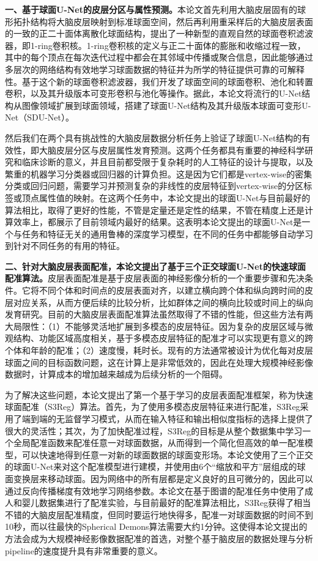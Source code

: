 \textbf{一、基于球面U-Net的皮层分区与属性预测。}本论文首先利用大脑皮层固有的球形拓扑结构将大脑皮层映射到标准球面空间，然后再利用重采样后的大脑皮层表面的一致的正二十面体离散化球面结构，提出了一种新型的直观自然的球面卷积滤波器，即1-ring卷积核。1-ring卷积核的定义与正二十面体的膨胀和收缩过程一致，其中的每个顶点在每次迭代过程中都会在其邻域中传播或聚合信息，因此能够通过多层次的网络结构有效地学习球面数据的特征并为所学的特征提供可靠的可解释性。基于这个新的球面卷积滤波器，我们开发了球面空间的球面卷积、池化和转置卷积，以及其升级版本可变形卷积与池化等操作。据此，本论文将流行的U-Net结构\cite{ronneberger2015u}从图像领域扩展到球面领域，搭建了球面U-Net结构及其升级版本球面可变形U-Net（SDU-Net）。

然后我们在两个具有挑战性的大脑皮层数据分析任务上验证了球面U-Net结构的有效性，即大脑皮层分区与皮层属性发育预测。这两个任务都具有重要的神经科学研究和临床诊断的意义，并且目前都受限于复杂耗时的人工特征的设计与提取，以及繁重的机器学习分类器或回归器的计算负担。这是因为它们都是vertex-wise的密集分类或回归问题，需要学习并预测复杂的非线性的皮层特征到vertex-wise的分区标签或顶点属性值的映射。在这两个任务中，本论文提出的球面U-Net与目前最好的算法相比，取得了更好的性能，不管是定量还是定性的结果，不管在精度上还是计算效率上，都展示了目前领域内最好的结果。这表明本论文提出的球面U-Net是一个与任务和特征无关的通用鲁棒的深度学习模型，在不同的任务中都能够自动学习到针对不同任务的有用的特征。

\textbf{二、针对大脑皮层表面配准，本论文提出了基于三个正交球面U-Net的快速球面配准算法。}皮层表面配准是基于皮层表面的神经影像分析的一个重要步骤和先决条件。它将不同个体和时间点的皮层表面对齐，以建立横向跨个体和纵向跨时间的皮层对应关系，从而方便后续的比较分析，比如群体之间的横向比较或时间上的纵向发育研究。目前的大脑皮层表面配准算法虽然取得了不错的性能，但这些方法有两大局限性：（1）不能够灵活地扩展到多模态的皮层特征。因为复杂的皮层区域与微观结构、功能区域高度相关，基于多模态皮层特征的配准才可以实现更有意义的跨个体和年龄的配准；（2）速度慢，耗时长。现有的方法通常被设计为优化每对皮层球面之间的目标函数问题，这在计算上是非常低效的，因此在处理大规模神经影像数据时，计算成本的增加越来越成为后续分析的一个阻碍。

为了解决这些问题，本论文提出了第一个基于学习的皮层表面配准框架，称为快速球面配准（S3Reg）算法。首先，为了使用多模态皮层特征来进行配准，S3Reg采用了端到端的无监督学习模式，从而在输入特征和输出相似度指标的选择上提供了很大的灵活性；其次，为了加快配准过程，S3Reg的目标是从整个数据集中学习一个全局配准函数来配准任意一对球面数据，从而得到一个简化但高效的单一配准模型，可以快速地得到任意一对新的球面数据的球面变形场。本论文使用了三个正交的球面U-Net来对这个配准模型进行建模，并使用由6个“缩放和平方”层组成的球面变换层来移动球面。因为网络中的所有层都是定义良好的且可微分的，因此可以通过反向传播梯度有效地学习网络参数。本论文在基于图谱的配准任务中使用了成人和婴儿数据集进行了配准实验，与目前最好的配准算法相比，S3Reg获得了相当不错的大脑皮层配准精度，但同时要运行地快得多，配准一对球面数据的时间不到10秒，而以往最快的Spherical Demons算法需要大约1分钟。这使得本论文提出的方法会成为大规模神经影像数据配准的首选，对整个基于脑皮层的数据处理与分析pipeline的速度提升具有非常重要的意义。

